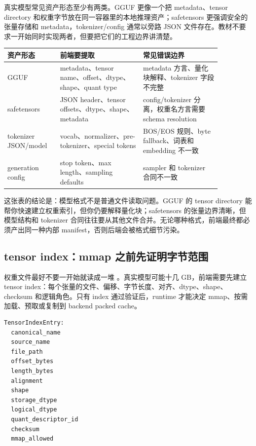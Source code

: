 真实模型常见资产形态至少有两类。GGUF 更像一个把 metadata、tensor directory 和权重字节放在同一容器里的本地推理资产；safetensors 更强调安全的张量存储和 metadata，tokenizer/config 通常以旁路 JSON 文件存在。教材不要求一开始同时实现两者，但要把它们的工程边界讲清楚。

\begin{center}
\small
\begin{tabular}{p{0.20\linewidth}p{0.34\linewidth}p{0.32\linewidth}}
\toprule
资产形态 & 前端要提取 & 常见错误边界 \\
\midrule
GGUF & metadata、tensor name、offset、dtype、shape、quant type & metadata 方言、量化块解释、tokenizer 字段不完整 \\
safetensors & JSON header、tensor offsets、dtype、shape、metadata & config/tokenizer 分离，权重名方言需要 schema resolution \\
tokenizer JSON/model & vocab、normalizer、pre-tokenizer、special tokens & BOS/EOS 规则、byte fallback、词表和 embedding 不一致 \\
generation config & stop token、max length、sampling defaults & sampler 和 tokenizer 合同不一致 \\
\bottomrule
\end{tabular}
\end{center}

这张表的结论是：模型格式不是普通文件读取问题。GGUF 的 tensor directory 能帮你快速建立权重索引，但你仍要解释量化块；safetensors 的张量边界清晰，但模型结构和 tokenizer 合同往往要从其他文件合并。无论哪种格式，前端最终都必须产出同一种内部 manifest，否则后端会被格式细节污染。

\subsection{tensor index：mmap 之前先证明字节范围}

权重文件最好不要一开始就读成一堆 。真实模型可能十几 GB，前端需要先建立 tensor index：每个张量的文件、偏移、字节长度、对齐、dtype、shape、checksum 和逻辑角色。只有 index 通过验证后，runtime 才能决定 mmap、按需加载、预取或复制到 backend packed cache。

\begin{lstlisting}[numbers=none,caption={tensor index 的最低字段}]
TensorIndexEntry:
  canonical_name
  source_name
  file_path
  offset_bytes
  length_bytes
  alignment
  shape
  storage_dtype
  logical_dtype
  quant_descriptor_id
  checksum
  mmap_allowed
\end{lstlisting}

